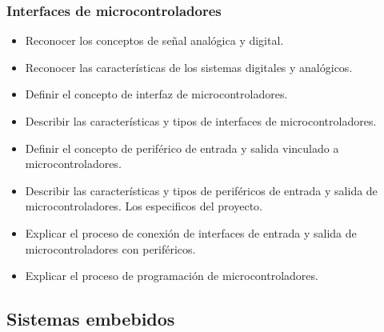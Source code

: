 \documentclass[a4paper,12pt]{article}
\begin{document}
	\subsubsection{Interfaces de microcontroladores}
	\begin{itemize}
		\item Reconocer los conceptos de señal analógica y digital.
		\item Reconocer las características de los sistemas digitales y analógicos.
		\item Definir el concepto de interfaz de microcontroladores.
		\item Describir las características y tipos de interfaces de microcontroladores.
		\item Definir el concepto de periférico de entrada y salida vinculado a microcontroladores.
		\item Describir las características y tipos de periféricos de entrada y salida de microcontroladores. Los especificos del proyecto.
		\item Explicar el proceso de conexión de interfaces de entrada y salida de microcontroladores con periféricos.
		\item Explicar el proceso de programación de microcontroladores.
	\end{itemize}
	
	\subsection{Sistemas embebidos}
\end{document}
